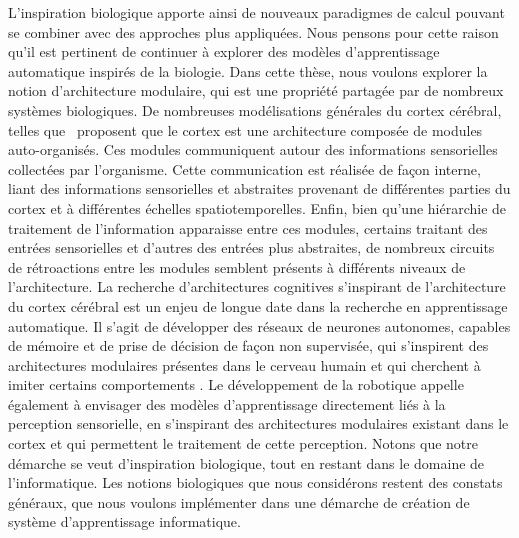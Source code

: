 L'inspiration biologique apporte ainsi de nouveaux paradigmes de calcul pouvant se combiner avec des approches plus appliquées. Nous pensons pour cette raison qu'il est pertinent de continuer à explorer des modèles d'apprentissage automatique inspirés de la biologie.
Dans cette thèse, nous voulons explorer la notion d'architecture modulaire, qui est une propriété partagée par de nombreux systèmes biologiques.
De nombreuses modélisations générales du cortex cérébral, telles que~\cite{binzegger05, Meunier2009HierarchicalMI,sporns_structure_2013,betzel_multi-scale_2017} proposent que le cortex est une architecture composée de modules auto-organisés. Ces modules communiquent autour des informations sensorielles collectées par l'organisme. Cette communication est réalisée de façon interne, liant des informations sensorielles et abstraites provenant de différentes parties du cortex et à différentes échelles spatiotemporelles. Enfin, bien qu'une hiérarchie de traitement de l'information apparaisse entre ces modules, certains traitant des entrées sensorielles et d'autres des entrées plus abstraites, de nombreux circuits de rétroactions entre les modules semblent présents à différents niveaux de l'architecture.
La recherche d'architectures cognitives s'inspirant de l'architecture du cortex cérébral est un enjeu de longue date dans la recherche en apprentissage automatique. Il s'agit de développer des réseaux de neurones autonomes, capables de mémoire et de prise de décision de façon non supervisée, qui s'inspirent des architectures modulaires présentes dans le cerveau humain et qui cherchent à imiter certains comportements \parencite{Kotseruba201840YO}. Le développement de la robotique appelle également à envisager des modèles d'apprentissage directement liés à la perception sensorielle, en s'inspirant des architectures modulaires existant dans le cortex et qui permettent le traitement de cette perception.
Notons que notre démarche se veut d'inspiration biologique, tout en restant dans le domaine de l'informatique.
Les notions biologiques que nous considérons restent des constats généraux, que nous voulons implémenter dans une démarche de création de système d'apprentissage informatique. 

